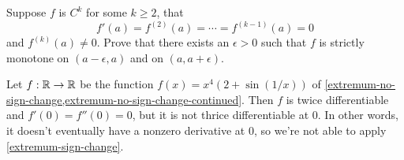 \begin{comment}
\begin{lemma} \label{eventual-nonvanishing-derivative}
	Suppose $I$ is an open interval, $f : I \to \R$ is $C^k$ for some positive integer $k$, that 
	\[ f(a) = f'(a) = f^{(2)}(a) = \dotsb = f^{(k-1)}(a) = 0, \] and that $f^{(k)}(a) > 0$. Then there exists an $\epsilon > 0$ such that $f$ is positive on $(a, a+\epsilon)$, and on $(a-\epsilon, a)$, $f$ is positive if $k$ is even and negative if $k$ is odd. Moreover, if $f^{(k)}(a) < 0$, then all instances of ``positive'' in the conclusion get replaced by ``negative'' and vice versa. 
\end{lemma}

\begin{proof}
	Let us suppose that $f^{(k)}(a) > 0$. By Taylor's theorem \ref{taylor-single}, we see that
	\[ f(a+h) = \frac{f^{(k)}(a)}{k!} h^k + r(h) \]
	where $|r(h)| = o(|h|^k)$ as $h \to 0$. Dividing through by $h^k$, we see that 
	\[ \frac{f(a+h)}{h^k} = \frac{f^{(k)}(a)}{k!} + \frac{r(h)}{h^k}. \]
	Since $f^{(k)}(a) > 0$, we also have $f^{(k)}(a)/k! > 0$. Since $\lim_{h \to 0} |r(h)/h^k| = 0$, there exists $\epsilon > 0$ such that $|r(h)/h^k| < f^{(k)}(a)/k!$ for all $|h| < \epsilon$. Then, if $0 < |h| < \epsilon$, we have
	\[ \frac{f(a+h)}{h^k} = \frac{f^{(k)}(a)}{k!} + \frac{r(h)}{h^k} > 0. \]
	Now note that if $k$ is even, then $h^k$ is always positive, so the lemma follows. On the other hand, if $k$ is odd, then $h^k$ is positive for positive $h$ and negative for negative $h$, and again the lemma follows. The proof when $f^{(k)}(a) < 0$ is similar. 
\end{proof}
\end{comment}

\begin{exercise} \label{extremum-sign-change}
	Suppose $f$ is $C^k$ for some $k \geq 2$, that
	\[ f'(a) = f^{(2)}(a) = \dotsb = f^{(k-1)}(a) = 0 \] and $f^{(k)}(a) \neq 0$. Prove that there exists an $\epsilon > 0$ such that $f$ is strictly monotone on $(a-\epsilon, a)$ and on $(a, a+\epsilon)$. 
\end{exercise}

\begin{example} \label{extremum-no-sign-change-final}
	Let $f : \mathbb{R} \to \mathbb{R}$ be the function $f(x) = x^4(2 + \sin(1/x))$ of \cref{extremum-no-sign-change,extremum-no-sign-change-continued}. Then $f$ is twice differentiable and $f'(0) = f''(0) = 0$, but it is not thrice differentiable at 0. In other words, it doesn't eventually have a nonzero derivative at 0, so we're not able to apply \cref{extremum-sign-change}. 
\end{example}


